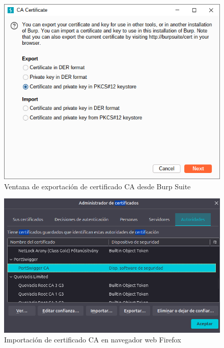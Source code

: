 \documentclass[letter,12pt]{article}
\begin{document}
\begin{figure}
    \centering
    \includegraphics[width=1\linewidth]{levanteyredireccione/Captura desde 2025-10-01 22-50-08.png}
    \caption{Ventana de exportación de certificado CA desde Burp Suite}
    \label{fig:certificateburp}
\end{figure}
\begin{figure}
    \centering
    \includegraphics[width=1\linewidth]{levanteyredireccione/Captura desde 2025-10-01 22-52-57.png}
    \caption{Importación de certificado CA en navegador web Firefox}
    \label{fig:certificate}
\end{figure}
\end{document}
